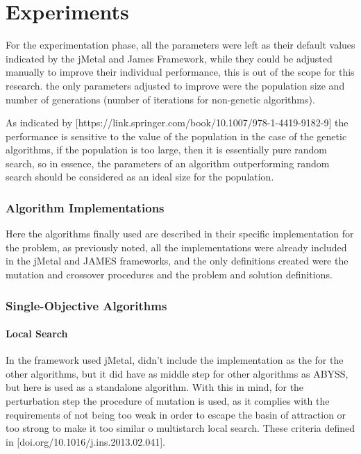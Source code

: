 \chapter{Experiments}
\label{chapter:chapter05}

For the experimentation phase, all the parameters were left as their default values indicated by the jMetal and James Framework, while they could be adjusted manually to improve their individual performance, this is out of the scope for this research. the only parameters adjusted to improve were the population size and number of generations (number of iterations for non-genetic algorithms).


As indicated by [https://link.springer.com/book/10.1007/978-1-4419-9182-9] the performance is sensitive to the value of the population in the case of the genetic algorithms, if the population is too large, then it is essentially pure random search, so in essence, the parameters of an algorithm outperforming random search should be considered as an ideal size for the population.

\subsection{Algorithm Implementations}

Here the algorithms finally used are described in their specific implementation for the problem, as previously noted, all the implementations were already included in the jMetal and JAMES frameworks, and the only definitions created were the mutation and crossover procedures and the problem and solution definitions.

\subsection{Single-Objective Algorithms}

\subsubsection{Local Search}

In the framework used jMetal, didn't include the implementation as the for the other algorithms, but it did have as middle step for other algorithms as ABYSS, but here is used as a standalone algorithm. With this in mind, for the perturbation step the procedure of mutation is used, as it complies with the requirements of not being too weak in order to escape the basin of attraction or too strong to make it too similar o multistarch local search. These criteria defined in [doi.org/10.1016/j.ins.2013.02.041].

